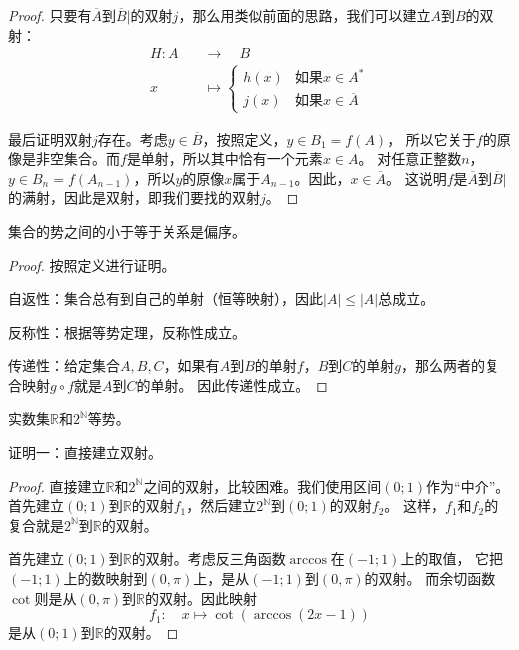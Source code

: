 \documentclass[12pt,UTF8]{ctexbook}
\begin{document}
\begin{appendix}
\begin{proof}
    只要有$\overline{A}$到$\overline{B}|$的双射$j$，那么用类似前面的思路，我们可以建立$A$到$B$的双射：
    \begin{align*}
        H : A \quad&\rightarrow \quad B  \\
        x \quad&\mapsto \left\{ \begin{array}{ll}
            h(x) & \mbox{如果} x\in A^*  \\
            j(x) & \mbox{如果} x\in \overline{A}
        \end{array} \right.
    \end{align*}

    最后证明双射$j$存在。考虑$y \in \overline{B}$，按照定义，$y\in B_1 = f(A)$，
    所以它关于$f$的原像是非空集合。而$f$是单射，所以其中恰有一个元素$x\in A$。
    对任意正整数$n$，$y\in B_n = f(A_{n-1})$，所以$y$的原像$x$属于$A_{n-1}$。因此，$x\in \overline{A}$。
    这说明$f$是$\overline{A}$到$\overline{B}|$的满射，因此是双射，即我们要找的双射$j$。

\end{proof}

\begin{tm}
    集合的势之间的小于等于关系是偏序。
\end{tm}

\begin{proof}
    按照定义进行证明。
    
    自返性：集合总有到自己的单射（恒等映射），因此$|A| \leqslant |A|$总成立。

    反称性：根据等势定理，反称性成立。

    传递性：给定集合$A,B,C$，如果有$A$到$B$的单射$f$，$B$到$C$的单射$g$，那么两者的复合映射$g\circ f$就是$A$到$C$的单射。
    因此传递性成立。

\end{proof}

\begin{tm}
    实数集$\mathbb{R}$和$2^\mathbb{N}$等势。
\end{tm}

证明一：直接建立双射。

\begin{proof}
    直接建立$\mathbb{R}$和$2^\mathbb{N}$之间的双射，比较困难。我们使用区间$(0;1)$作为“中介”。
    首先建立$(0;1)$到$\mathbb{R}$的双射$f_1$，然后建立$2^\mathbb{N}$到$(0;1)$的双射$f_2$。
    这样，$f_1$和$f_2$的复合就是$2^\mathbb{N}$到$\mathbb{R}$的双射。
    
    首先建立$(0;1)$到$\mathbb{R}$的双射。考虑反三角函数$\arccos$在$(-1;1)$上的取值，
    它把$(-1;1)$上的数映射到$(0,\pi)$上，是从$(-1;1)$到$(0,\pi)$的双射。
    而余切函数$\cot$则是从$(0,\pi)$到$\mathbb{R}$的双射。因此映射
    $$ f_1 :\quad x \mapsto \cot{\left(\arccos{(2x-1)}\right)} $$
    是从$(0;1)$到$\mathbb{R}$的双射。


\end{proof}
\end{appendix}
\end{document}
